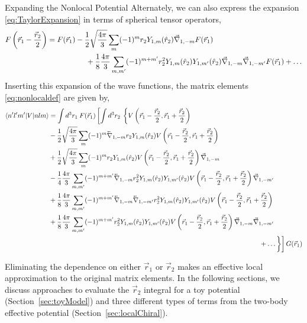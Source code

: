 \begin{section}{Expanding the Nonlocal Potential}
Alternately, we can also express the expansion \eqref{eq:TaylorExpansion} in terms of spherical tensor operators,
\begin{align}
\begin{split}
F\left(\vec{r}_1-\frac{\vec{r}_2}{2}\right)=
F(\vec{r}_1)&-\frac{1}{2}\sqrt{\frac{4\pi}{3}}\sum_{m}(-1)^m r_2 Y_{1,m}(\hat{r}_2) \vec{\nabla}_{1,-m} F(\vec{r}_1) \\
&\hspace{.5cm}+\frac{1}{8}\frac{4\pi}{3}\sum_{m,m'}(-1)^{m+m'}r_2^2 Y_{1,m}(\hat{r}_2)Y_{1,m'}(\hat{r}_2)\vec{\nabla}_{1,-m}\vec{\nabla}_{1,-m'}F(\vec{r}_1)
+\dots 
\end{split}
\end{align}
Inserting this expansion of the wave functions, the matrix elements \eqref{eq:nonlocaldef} are given by,
\begin{equation}\label{eq:expansionSpherical}
\begin{split}
\braket{n' l' m'| V | n l m} &= \int d^3r_1\: F(\vec{r}_1)\left[\int d^3r_2\:\left\{V\left(\vec{r}_1-\frac{\vec{r}_2}{2},\vec{r}_1+\frac{\vec{r}_2}{2}\right) \right.\right. \\
&-\frac{1}{2}\sqrt{\frac{4\pi}{3}}\sum_m (-1)^m \lvec{\nabla}_{1,-m} r_2Y_{1,m}(\hat{r}_2)V\left(\vec{r}_1-\frac{\vec{r}_2}{2},\vec{r}_1+\frac{\vec{r}_2}{2}\right)\\
&+\frac{1}{2}\sqrt{\frac{4\pi}{3}}\sum_m (-1)^m r_2Y_{1,m}(\hat{r}_2)V\left(\vec{r}_1-\frac{\vec{r}_2}{2},\vec{r}_1+\frac{\vec{r}_2}{2}\right) \vec{\nabla}_{1,-m} \\
&-\frac{1}{4}\frac{4\pi}{3}\sum_{m,m'}(-1)^{m+m'}\lvec{\nabla}_{1,-m} r_2^2 Y_{1,m}(\hat{r}_2)Y_{1,m'}(\hat{r}_2)V\left(\vec{r}_1-\frac{\vec{r}_2}{2},\vec{r}_1+\frac{\vec{r}_2}{2}\right) \vec{\nabla}_{1,-m'}\\
&+\frac{1}{8}\frac{4\pi}{3}\sum_{m,m'}(-1)^{m+m'}\lvec{\nabla}_{1,-m}\lvec{\nabla}_{1,-m'} r_2^2 Y_{1,m}(\hat{r}_2)Y_{1,m'}(\hat{r}_2)V\left(\vec{r}_1-\frac{\vec{r}_2}{2},\vec{r}_1+\frac{\vec{r}_2}{2}\right) \\
&+\frac{1}{8}\frac{4\pi}{3}\sum_{m,m'}(-1)^{m+m'} r_2^2 Y_{1,m}(\hat{r}_2)Y_{1,m'}(\hat{r}_2)V\left(\vec{r}_1-\frac{\vec{r}_2}{2},\vec{r}_1+\frac{\vec{r}_2}{2}\right)\vec{\nabla}_{1,-m}\vec{\nabla}_{1,-m'}
 \\
&\hspace{11cm}\left.\left.\vphantom{V\left(\vec{r}_1-\frac{\vec{r}_2}{2},\vec{r}_1+\frac{\vec{r}_2}{2}\right)}+\dots \right\}\right]G(\vec{r}_1)
\end{split}
\end{equation}

Eliminating the dependence on either $\vec{r}_1$ or $\vec{r}_2$ makes an effective local approximation to the original matrix elements. In the following sections, we discuss approaches to evaluate the $\vec{r}_2$ integral for a toy potential (Section~\ref{sec:toyModel}) and three different types of terms from the two-body effective potential (Section~\ref{sec:localChiral}).

\end{section}

